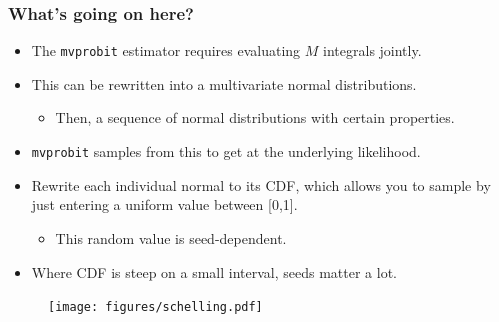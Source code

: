 \documentclass[12pt]{beamer}
\begin{document}
\begin{frame}
\frametitle{What's going on here?}


\begin{itemize}
\item The \texttt{mvprobit} estimator requires evaluating $M$ integrals jointly.\vspace{.1in}
\item This can be rewritten into a multivariate normal distributions.\vspace{.1in}
\begin{itemize}
\item Then, a sequence of normal distributions with certain properties.\vspace{.1in}
\end{itemize}
\item \texttt{mvprobit} samples from this to get at the underlying likelihood.\vspace{.1in}
\item Rewrite each individual normal to its CDF, which allows you to sample by just entering a uniform value between [0,1].\vspace{.1in}
\begin{itemize}
\item This random value is seed-dependent.\vspace{.1in}
\end{itemize}
\item Where CDF is steep on a small interval, seeds matter a lot.
\end{itemize}

\end{frame}

\begin{frame}
	\begin{center}
		\begin{figure}
			\texttt{[image: figures/schelling.pdf]}
		\end{figure}
	\end{center}
\end{frame}
\end{document}
